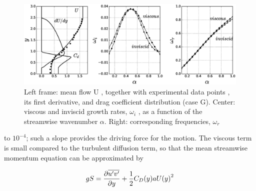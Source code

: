 \begin{figure}[H]
	\centering
	\includegraphics[width=1\linewidth]{chapter_3/figure/2}
	\caption{Left frame: mean flow U , together with experimental data points \cite{ghisalberti2004limited},  its first derivative, and drag coefficient
		distribution (case G). Center: viscous and inviscid growth rates, $\omega_i$ , as a function of the streamwise wavenumber $\alpha$. Right:
		corresponding frequencies, $\omega_r$}
	\label{fig:2}
\end{figure}

to $10^{-4}$; such a slope provides the driving force for the motion. The viscous term is small compared to
the turbulent diffusion term, so that the mean streamwise momentum equation can be approximated
by

\begin{equation}
gS = \frac{\partial \overline{u'v'}}{\partial y} + \frac{1}{2} C_D(y) a {U(y)}^2 
\label{eq:1}
\end{equation}

